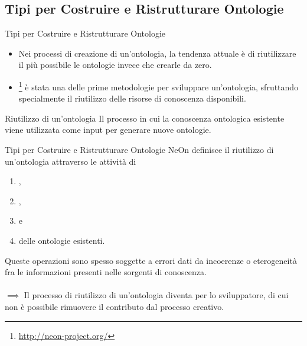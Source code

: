\subsection{Tipi per Costruire e Ristrutturare Ontologie}

\begin{frame}{Tipi per Costruire e Ristrutturare Ontologie}
	\begin{itemize}
		\item Nei processi di creazione di un’ontologia, la tendenza attuale è di riutilizzare il più possibile le ontologie invece che crearle da zero. 
	
		\item {}\footnote{\url{http://neon-project.org/}} è stata una delle prime metodologie per sviluppare un'ontologia, sfruttando specialmente il riutilizzo delle risorse di conoscenza disponibili.
	\end{itemize}
	\begin{block}{Riutilizzo di un'ontologia}
		Il processo in cui la conoscenza ontologica esistente viene utilizzata come input per generare nuove ontologie.
	\end{block}
	
\end{frame}

\begin{frame}{Tipi per Costruire e Ristrutturare Ontologie}
	NeOn definisce il riutilizzo di un'ontologia attraverso le attività di
\begin{enumerate}
	\item {},
	\item {},
	\item {} e
	\item {} delle ontologie esistenti.
\end{enumerate}
Queste operazioni sono spesso soggette a errori dati da incoerenze o eterogeneità fra le informazioni presenti nelle sorgenti di conoscenza.\\~\\
$\implies$ Il processo di riutilizzo di un'ontologia diventa  per lo sviluppatore, di cui non è possibile rimuovere il contributo dal processo creativo.
\end{frame}

